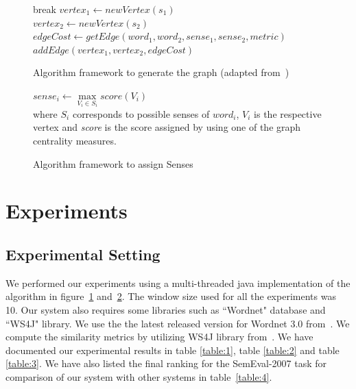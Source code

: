 \documentclass[12pt,letterpaper]{article}
\begin{document}
\begin{figure}[H] 
\begin{algorithm}[H]
{
	{
		{
			break
		}
		\Else
		{
			{
				{
					$vertex_1 \gets newVertex(s_1)$ \\
					$vertex_2 \gets newVertex(s_2)$ \\
					$edgeCost \gets getEdge(word_1,word_2,sense_1,sense_2,metric)$ 
					$addEdge(vertex_1,vertex_2,edgeCost)$
				}	
			}
		}
	}
}
\end{algorithm}
\caption{Algorithm framework to generate the graph (adapted from~\cite{Sinha})}
\label{fig:2}
\end{figure}

\begin{figure}[H]
\begin{algorithm}[H]
{
	$sense_i\gets \max\limits_{V_i \in S_i} score(V_i)$ \\
	where $S_i$ corresponds to possible senses of $word_i$, $V_i$ is the respective vertex and \textit{score} is the score assigned by using one of the graph centrality measures.
}
\end{algorithm}
\caption{Algorithm framework to assign Senses}
\label{fig:3}
\end{figure}

\section{Experiments}
\label{sec:experiments}

\subsection{Experimental Setting}
We performed our experiments using a multi-threaded java implementation of the algorithm in figure~\ref{fig:2} and~\ref{fig:3}. The window size used for all the experiments was 10. Our system also requires some libraries such as ``Wordnet" database and ``WS4J" library. We use the the latest released version for Wordnet 3.0 from~\cite{wordneturl}. We compute the similarity metrics by utilizing WS4J library from~\cite{WS4Jurl}. We have documented our experimental results in table \ref{table:1}, table \ref{table:2} and table \ref{table:3}. We have also listed the final ranking for the SemEval-2007 task for comparison of our system with other systems in table~\ref{table:4}.
\end{document}
